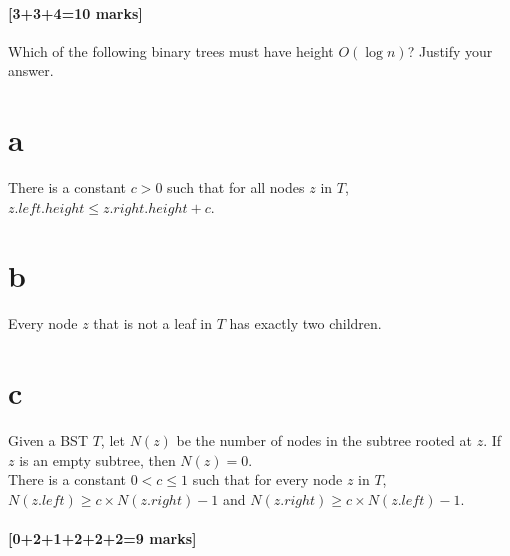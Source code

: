 \documentclass[12pt]{article}
\begin{document}
	\subsection{[3+3+4=10 marks]}
	
	Which of the following binary trees must have height $O(\log n)$?  Justify your answer.
	
	\begin{enumerate}
		\part{a} There is a constant $c > 0$ such that for all nodes $z$ in $T$, $z.left.height \leq z.right.height + c$.
		\part{b} Every node $z$ that is not a leaf in $T$ has exactly two children.
		\part{c} Given a BST $T$, let $N(z)$ be the number of nodes in the subtree rooted at $z$.
		If $z$ is an empty subtree, then $N(z) = 0$. \\
		There is a constant $0 < c \leq 1$ such that for every node $z$ in $T$, $N(z.left) \geq c\times N(z.right) - 1$ and $N(z.right) \geq c\times N(z.left) - 1$.
	\end{enumerate}
	
	\subsection{[0+2+1+2+2+2=9 marks]}
	
\end{document}
